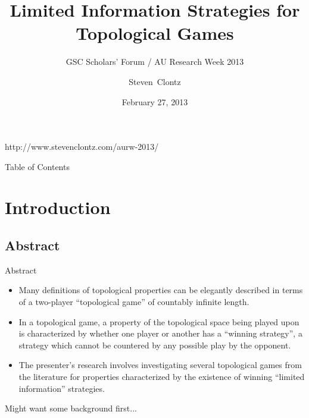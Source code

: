 \documentclass{beamer}
\title[Limited Information Strategies for Topological Games] %
{Limited Information Strategies for Topological Games}
\subtitle
{GSC Scholars' Forum / AU Research Week 2013} %
\author%
{Steven~Clontz}%
\institute[Auburn University] %
{
  Department of Mathematics and Statistics\\
  Auburn University}
\date[13-02-27] %
{February 27, 2013}
\begin{document}
\begin{frame}
  \titlepage

  {\tiny http://www.stevenclontz.com/aurw-2013/}
\end{frame}

\begin{frame}{Table of Contents}
  \tableofcontents
\end{frame}




\section{Introduction}

\subsection{Abstract}

\begin{frame}{Abstract}%

  \begin{itemize}
  \item
    Many definitions of topological properties can be elegantly described in terms of a two-player ``topological game'' of countably infinite length. 
  \item
    In a topological game, a property of the topological space being played upon is characterized by whether one player or another has a ``winning strategy'', a strategy which cannot be countered by any possible play by the opponent. 
  \item 
    The presenter's research involves investigating several topological games from the literature for properties characterized by the existence of winning ``limited information'' strategies.
  \end{itemize}
  \pause
Might want some background first...
\end{frame}
\end{document}
